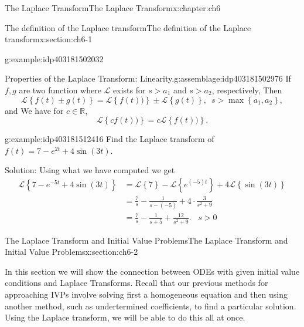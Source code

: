 \documentclass[oneside,10pt,]{book}
\numberwithin{equation}{section}
\numberwithin{equation}{section}
\newcommand{\amp}{&}
\begin{document}
\begin{chapterptx}{The Laplace Transform}{}{The Laplace Transform}{}{}{x:chapter:ch6}
\begin{sectionptx}{The definition of the Laplace transform}{}{The definition of the Laplace transform}{}{}{x:section:ch6-1}
\begin{example}{}{g:example:idp403181502032}
\begin{equation*}
\end{equation*}
%
\end{example}
\begin{assemblage}{Properties of the Laplace Transform: Linearity.}{g:assemblage:idp403181502976}%
If \(f,g\) are two function where \(\mathcal{L}\) exists for \(s>a_{1}\) and \(s>a_{2}\), respectively, Then%
\begin{equation*}
\mathcal{L}\left\{ f(t)\pm g(t)\right\} =\mathcal{L}\left\{ f(t))\right\} \pm\mathcal{L}\left\{ g(t)\right\} ,\,\,\,s>\max\left\{ a_{1},a_{2}\right\} ,
\end{equation*}
and We have for \(c\in\mathbb{R}\),%
\begin{equation*}
\mathcal{L}\left\{ cf(t))\right\} =c\mathcal{L}\left\{ f(t))\right\} .
\end{equation*}
%
\end{assemblage}
\begin{example}{}{g:example:idp403181512416}%
Find the Laplace transform of \(f(t)=7-e^{2t}+4\sin(3t)\).%
\par
Solution: Using what we have computed we get%
\begin{align*}
\mathcal{L}\left\{ 7-e^{-5t}+4\sin(3t)\right\}  \amp =\mathcal{L}\left\{ 7\right\} -\mathcal{L}\left\{ e^{(-5)t}\right\} +4\mathcal{L}\left\{ \sin(3t)\right\} \\
\amp =\frac{7}{s}-\frac{1}{s-(-5)}+4\cdot\frac{3}{s^{2}+9}\\
\amp =\frac{7}{s}-\frac{1}{s+5}+\frac{12}{s^{2}+9}.\,\,\,\,\,s>0
\end{align*}
%
\end{example}
\end{sectionptx}
%
%
\typeout{************************************************}
\typeout{************************************************}
%
\begin{sectionptx}{The Laplace Transform and Initial Value Problems}{}{The Laplace Transform and Initial Value Problems}{}{}{x:section:ch6-2}
\begin{introduction}{}%
In this section we will show the connection between ODEs with given initial value conditions and Laplace Transforms. Recall that our previous methods for approaching IVPs involve solving first a homogeneous equation and then using another method, such as undertermined coefficients, to find a particular solution. Using the Laplace transform, we will be able to do this all at once.%
\par

\end{introduction}
\end{sectionptx}
\end{chapterptx}
\end{document}
